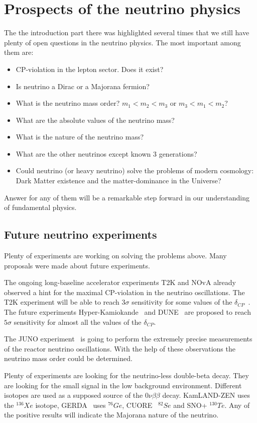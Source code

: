 \documentclass[../main.tex]{subfiles}
\begin{document}
\chapter{Prospects of the neutrino physics}
The the introduction part there was highlighted several times that we still have plenty of open questions in the neutrino physics. The most important among them are:
\begin{itemize}
  \item CP-violation in the lepton sector. Does it exist?
  \item Is neutrino a Dirac or a Majorana fermion?
  \item What is the neutrino mass order? $m_1<m_2<m_3$ or $m_3<m_1<m_2$?
  \item What are the absolute values of the neutrino mass?
  \item What is the nature of the neutrino mass?
  \item What are the other neutrinos except known 3 generations?
  \item Could neutrino (or heavy neutrino) solve the problems of modern cosmology: Dark Matter existence and the matter-dominance in the Universe?
\end{itemize}

Answer for any of them will be a remarkable step forward in our understanding of fundamental physics.

\section{Future neutrino experiments}
\label{intro:future}
Plenty of experiments are working on solving the problems above. Many proposals were made about future experiments.

The ongoing long-baseline accelerator experiments T2K and NOvA already observed a hint for the maximal CP-violation in the neutrino oscillations. The T2K experiment will be able to reach $3\sigma$ sensitivity for some values of the $\delta_{CP}$~\cite{Abe2016e}. The future experiments Hyper-Kamiokande~\cite{Proto-Collaboration2018} and DUNE~\cite{Acciarri2016} are proposed to reach $5\sigma$ sensitivity for almost all the values of the $\delta_{CP}$.

The JUNO experiment~\cite{Cerna2020} is going to perform the extremely precise measurements of the reactor neutrino oscillations. With the help of these observations the neutrino mass order could be determined.

Plenty of experiments are looking for the neutrino-less double-beta decay. They are looking for the small signal in the low background environment. Different isotopes are used as a supposed source of the $0\nu\beta\beta$ decay. KamLAND-ZEN uses the ${}^{136}Xe$ isotope, GERDA~\cite{DiMarco2020} uses ${}^{76}Ge$, CUORE~\cite{Cardani2020} ${}^{82}Se$ and SNO+ ${}^{130}Te$. Any of the positive results will indicate the Majorana nature of the neutrino.
\end{document}
